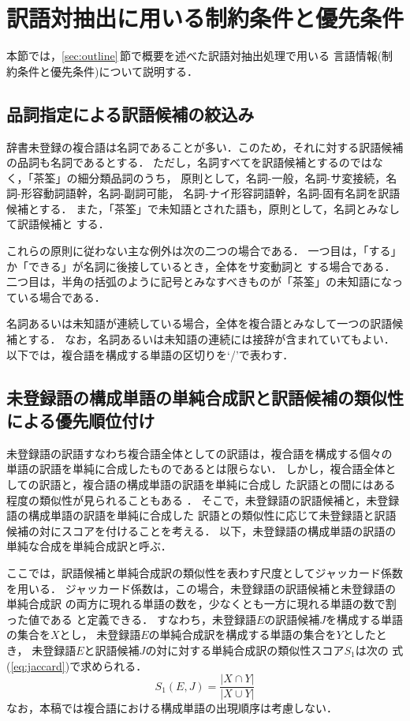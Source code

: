 \section{訳語対抽出に用いる制約条件と優先条件}
\label{sec:conditions}

本節では，\ref{sec:outline}\,節で概要を述べた訳語対抽出処理で用いる
言語情報(制約条件と優先条件)について説明する．


\subsection{品詞指定による訳語候補の絞込み}
\label{sec:conditions:pos}

辞書未登録の複合語は名詞であることが多い．このため，それに対する訳語候補
の品詞も名詞であるとする．
ただし，名詞すべてを訳語候補とするのではなく，「茶筌」の細分類品詞のうち，
原則として，名詞-一般，名詞-サ変接続，名詞-形容動詞語幹，名詞-副詞可能，
名詞-ナイ形容詞語幹，名詞-固有名詞を訳語候補とする．
また，「茶筌」で未知語とされた語も，原則として，名詞とみなして訳語候補と
する．

これらの原則に従わない主な例外は次の二つの場合である．
一つ目は，「する」か「できる」が名詞に後接しているとき，全体をサ変動詞と
する場合である．
二つ目は，半角の括弧のように記号とみなすべきものが「茶筌」の未知語になっ
ている場合である．

名詞あるいは未知語が連続している場合，全体を複合語とみなして一つの訳語候
補とする． 
なお，名詞あるいは未知語の連続には接辞が含まれていてもよい．
以下では，複合語を構成する単語の区切りを`/'で表わす． 


\subsection{未登録語の構成単語の単純合成訳と訳語候補の類似性による優先順位付け}
\label{sec:conditions:element}

未登録語の訳語すなわち複合語全体としての訳語は，複合語を構成する個々の
単語の訳語を単純に合成したものであるとは限らない．
しかし，複合語全体としての訳語と，複合語の構成単語の訳語を単純に合成し
た訳語との間にはある程度の類似性が見られることもある
\cite{Kumano94,Takao96}． 
そこで，未登録語の訳語候補と，未登録語の構成単語の訳語を単純に合成した
訳語との類似性に応じて未登録語と訳語候補の対にスコアを付けることを考える．
以下，未登録語の構成単語の訳語の単純な合成を単純合成訳と呼ぶ．

ここでは，訳語候補と単純合成訳の類似性を表わす尺度としてジャッカード係数
\cite{Romesburg92}を用いる．
ジャッカード係数は，この場合，未登録語の訳語候補と未登録語の単純合成訳
の両方に現れる単語の数を，少なくとも一方に現れる単語の数で割った値である
と定義できる．
すなわち，未登録語$E$の訳語候補$J$を構成する単語の集合を$X$とし，
未登録語$E$の単純合成訳を構成する単語の集合を$Y$としたとき，
未登録語$E$と訳語候補$J$の対に対する単純合成訳の類似性スコア$S_1$は次の
式(\ref{eq:jaccard})で求められる．
\begin{equation}
S_1(E,J) = \frac{|X \cap Y|}{|X \cup Y|}
\label{eq:jaccard}
\end{equation}
なお，本稿では複合語における構成単語の出現順序は考慮しない．

